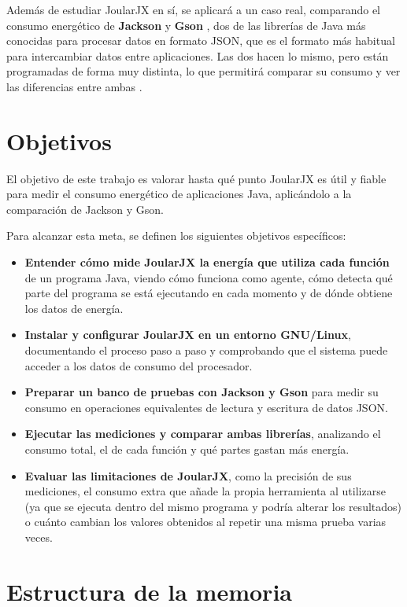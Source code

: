 Además de estudiar JoularJX en sí, se aplicará a un caso real, comparando el
consumo energético de \textbf{Jackson} \cite{jackson} y \textbf{Gson}
\cite{gson}, dos de las librerías de Java más conocidas para procesar datos en
formato JSON, que es el formato más habitual para intercambiar datos entre aplicaciones. Las dos hacen lo mismo, pero están programadas de forma muy
distinta, lo que permitirá comparar su consumo y ver las diferencias entre ambas
\cite{noureddine2025}.

\section{Objetivos}
\label{sec:objetivos}


El objetivo de este trabajo es valorar hasta qué punto JoularJX es útil y fiable
para medir el consumo energético de aplicaciones Java, aplicándolo a la
comparación de Jackson y Gson.

Para alcanzar esta meta, se definen los siguientes objetivos específicos:

\begin{itemize}
	\item \textbf{Entender cómo mide JoularJX la energía que utiliza cada función}
	de un programa Java, viendo cómo funciona como agente, cómo detecta qué parte
	del programa se está ejecutando en cada momento y de dónde obtiene los datos
	de energía.
	\item \textbf{Instalar y configurar JoularJX en un entorno GNU/Linux},
	documentando el proceso paso a paso y comprobando que el sistema puede acceder a los datos de consumo del procesador.
	\item \textbf{Preparar un banco de pruebas con Jackson y Gson} para medir su consumo en operaciones equivalentes de
	lectura y escritura de datos JSON.
	\item \textbf{Ejecutar las mediciones y comparar ambas librerías}, analizando
	el consumo total, el de cada función y qué partes gastan más energía.
	\item \textbf{Evaluar las limitaciones de JoularJX}, como la precisión de sus
	mediciones, el consumo extra que añade la propia herramienta al utilizarse (ya que se ejecuta dentro del mismo programa y podría alterar los resultados) o cuánto cambian los valores obtenidos al repetir una misma prueba varias veces.
\end{itemize}


\section{Estructura de la memoria}
\label{sec:estructura}

